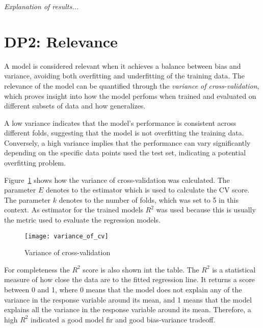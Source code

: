 \textit{Explanation of results...}


\section{DP2: Relevance}\label{sec:relevance}

A model is considered relevant when it achieves a balance between bias and variance, avoiding
both overfitting and underfitting of the training data.
The relevance of the model can be quantified through the \textit{variance of cross-validation},
which proves insight into how the model perfoms when trained and evaluated on different subsets
of data and how generalizes.

A low variance indicates that the model's performance is consistent across different folds,
suggesting that the model is not overfitting the training data.
Conversely, a high variance implies that the performance can vary significantly depending on the
specific data points used the test set, indicating a potential overfitting problem.

Figure~\ref{fig:variance-of-cv} shows how the variance of cross-validation was calculated.
The parameter $E$ denotes to the estimator which is used to calculate the \ac{CV} score.
The parameter $k$ denotes to the number of folds, which was set to 5 in this context.
As estimator for the trained models $R^2$ was used because this is usually the metric used to
evaluate the regression models.

\begin{figure}[h]
    \begin{tcolorbox}[arc=0pt,boxrule=0.5pt]
        \centering
        \texttt{[image: variance\_of\_cv]}
        \caption{Variance of cross-validation}
        \label{fig:variance-of-cv}
    \end{tcolorbox}
\end{figure}

For completeness the $R^2$ score is also shown int the table.
The $R^2$ is a statistical measure of how close the data are to the fitted regression line.
It returns a score between 0 and 1, where 0 means that the model does not explain any of the
variance in the response variable around its mean, and 1 means that the model explains all the
variance in the response variable around its mean.
Therefore, a high $R^2$ indicated a good model fir and good bias-variance tradeoff.
\cite[p. 43]{muller_introductionmachinelearning_2016}

